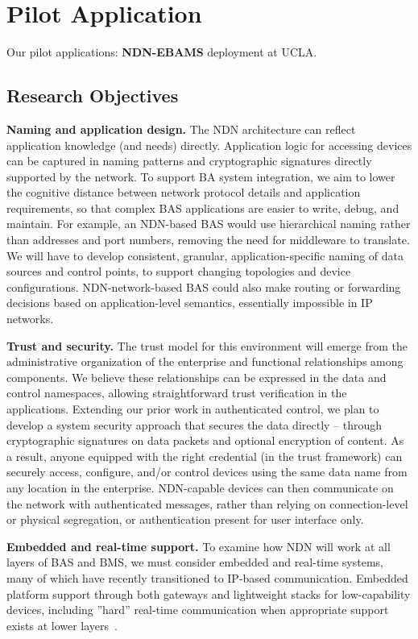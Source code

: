 \section{Pilot Application}


Our pilot applications:  \textbf{NDN-EBAMS} deployment at UCLA. 

\subsection{Research Objectives} 

{\bf Naming and application design.} The NDN architecture can reflect application knowledge (and needs) directly. Application logic for accessing devices can be captured in naming patterns and cryptographic signatures directly supported by the network. To support BA system integration, we aim to lower the cognitive distance between network protocol details and application requirements, so that complex BAS applications are easier to write, debug, and maintain. For example, an NDN-based BAS would use hierarchical naming rather than addresses and port numbers, removing the need for middleware to translate.  We will have to develop
consistent, granular, application-specific naming of data sources and control points, to
support changing topologies and device configurations.  NDN-network-based BAS could also 
make routing or forwarding decisions based on application-level semantics, 
essentially impossible in IP networks.

{\bf Trust and security.} The trust model for this environment will emerge from the administrative organization of the enterprise and functional relationships among components.  We believe these relationships can be expressed in the data and control namespaces, allowing straightforward trust verification in the applications.  Extending our prior work in authenticated control, we plan to develop a system security approach that secures the data directly – through cryptographic signatures on data packets and optional encryption of content. As a result, anyone equipped with the right credential (in the trust framework) can securely access, configure, and/or control  devices using the same data name from any location in the enterprise. NDN-capable devices can then communicate on the network with authenticated messages, rather than relying on connection-level or physical segregation, or authentication present for user interface only.

{\bf Embedded and real-time support.}  To examine how NDN will work at all layers of BAS and BMS, we must consider embedded and real-time systems, many of which have recently transitioned to IP-based communication.  Embedded platform support through both gateways and lightweight stacks for low-capability devices, including ''hard'' real-time communication when appropriate support exists at lower 
layers~\cite{loeser2004low, skeie2006timeliness}.

